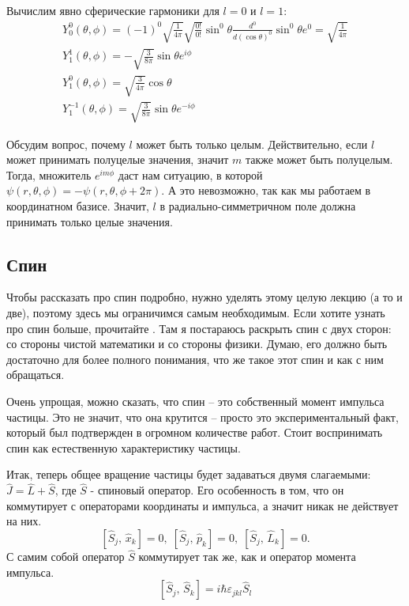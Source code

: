 Вычислим явно сферические гармоники для $l=0$ и $l=1$:
\begin{gather*}
Y^0_0(\theta,\phi) = (-1)^0\sqrt{\frac{1}{4\pi}}\sqrt{\frac{0!}{0!}}\sin^0\theta \frac{d^0}{d(\cos\theta)^0} \sin^0 \theta e^{0} = \sqrt{\frac{1}{4\pi}}\\
Y^1_1(\theta,\phi) = -\sqrt{\frac{3}{8\pi}}\sin\theta e^{i\phi}\\
Y^0_1(\theta,\phi) = \sqrt{\frac{3}{4\pi}}\cos\theta\\
Y^{-1}_1(\theta,\phi) = \sqrt{\frac{3}{8\pi}}\sin\theta e^{-i\phi}
\end{gather*}

Обсудим вопрос, почему $l$ может быть только целым. Действительно, если $l$ может принимать полуцелые значения, значит $m$ также может быть полуцелым. Тогда, множитель $e^{im\phi}$ даст нам ситуацию, в которой $\psi(r, \theta, \phi) = -\psi(r, \theta, \phi + 2\pi)$. А это невозможно, так как мы работаем в координатном базисе. Значит, $l$ в радиально-симметричном поле должна принимать только целые значения.

\subsection{Спин}
\hspace{1em} Чтобы рассказать про спин подробно, нужно уделять этому целую лекцию (а то и две), поэтому здесь мы ограничимся самым необходимым. Если хотите узнать про спин больше, прочитайте . Там я постараюсь раскрыть спин с двух сторон: со стороны чистой математики и со стороны физики. Думаю, его должно быть достаточно для более полного понимания, что же такое этот спин и как с ним обращаться.

Очень упрощая, можно сказать, что спин -- это собственный момент импульса частицы. Это не значит, что она крутится -- просто это экспериментальный факт, который был подтвержден в огромном количестве работ. Стоит воспринимать спин как естественную характеристику частицы.

Итак, теперь общее вращение частицы будет задаваться двумя слагаемыми: $\hat{J} = \hat{L} + \hat{S}$, где $\hat{S}$ - спиновый оператор. Его особенность в том, что он коммутирует с операторами координаты и импульса, а значит никак не действует на них.
\[
\left[\hat{S}_j, \, \hat{x}_k\right] = 0,\; \left[\hat{S}_j, \, \hat{p}_k\right] = 0,\; \left[\hat{S}_j, \, \hat{L}_k\right] = 0.
\]
С самим собой оператор $\hat{S}$ коммутирует так же, как и оператор момента импульса.
\[
\left[\hat{S}_j, \, \hat{S}_k\right] = i\hbar\varepsilon_{jkl}\hat{S}_l
\]


